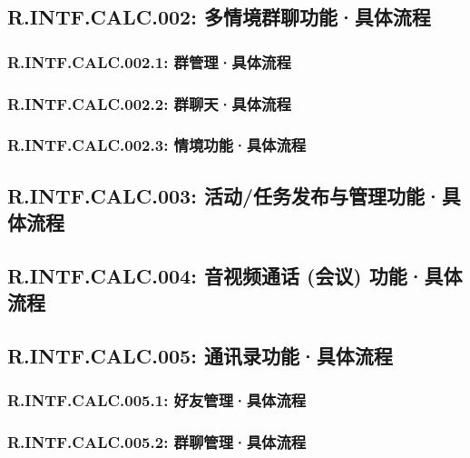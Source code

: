     \subsection{R.INTF.CALC.002: 多情境群聊功能·具体流程}
        \subsubsection{R.INTF.CALC.002.1: 群管理·具体流程}
        \subsubsection{R.INTF.CALC.002.2: 群聊天·具体流程}
        \subsubsection{R.INTF.CALC.002.3: 情境功能·具体流程}
    \subsection{R.INTF.CALC.003: 活动/任务发布与管理功能·具体流程}
    \subsection{R.INTF.CALC.004: 音视频通话 (会议) 功能·具体流程}
    \subsection{R.INTF.CALC.005: 通讯录功能·具体流程}
        \subsubsection{R.INTF.CALC.005.1: 好友管理·具体流程}
        \subsubsection{R.INTF.CALC.005.2: 群聊管理·具体流程}
